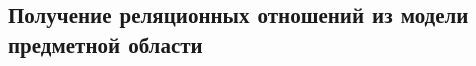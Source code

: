 \documentclass[10pt, a4paper, titlepage]{article}
\begin{document}
\subsection{Получение реляционных отношений из модели предметной области}

{
    
    
    \newcommand{\pk}[1]{\textbf{#1}}
    
    \newcommand{\fk}[1]{\textit{#1}}
    
    \newcommand{\pfk}[1]{\pk{\fk{#1}}}
    
    \newcommand{\firstColumn}[4]{#1 - \newline #2 - \newline #3 \newline\newline #4}
    
    \newcommand{\thirdColumn}[6]{
    #1 \newline 
    \underline{Первичный ключ} - #2 \newline 
    \setbox0=\hbox{#3\unskip}\ifdim\wd0=0pt
    \else
      \underline{Внешний(е) ключ(-и)}: #3 \newline
    \fi
    #4 \newline 
    \underline{Первичный ключ} - #5 \newline
    \setbox0=\hbox{#6\unskip}\ifdim\wd0=0pt
    \else
      \underline{Внешний(е) ключ(-и)}: #6 \newline
    \fi
    }
    
    \newcommand\generalizedColumn[6]{\thirdColumn{#1:}{#2}{#3}{#4:}{#5}{#6}}
    
    
    
    \newcommand\ruleOneMondatoryOneMondatoryNum{1}
    \newcommand\ruleOneMondatoryOneMondatory{1 Об - 1 Об}
    
    \newcommand\ruleOneMondatoryOneOptionalNum{2}
    \newcommand\ruleOneMondatoryOneOptional{1 Об - 1 Н/О}
    \newcommand\ruleOneOptionalOneMondatoryNum{2}
    \newcommand\ruleOneOptionalOneMondatory{1 Н/О - 1 Об}
    
    \newcommand\ruleOneOptionalOneOptionalNum{3}
    \newcommand\ruleOneOptionalOneOptional{1 Н/О - 1 Н/О}
    
    \newcommand\ruleOneOptionalManyMondatoryNum{4}
    \newcommand\ruleOneOptionalManyMondatory{1 Н/О - М Об}
    \newcommand\ruleManyMondatoryOneOptionalNum{4}
    \newcommand\ruleManyMondatoryOneOptional{М Об - 1 Н/О}
    
}
\end{document}
